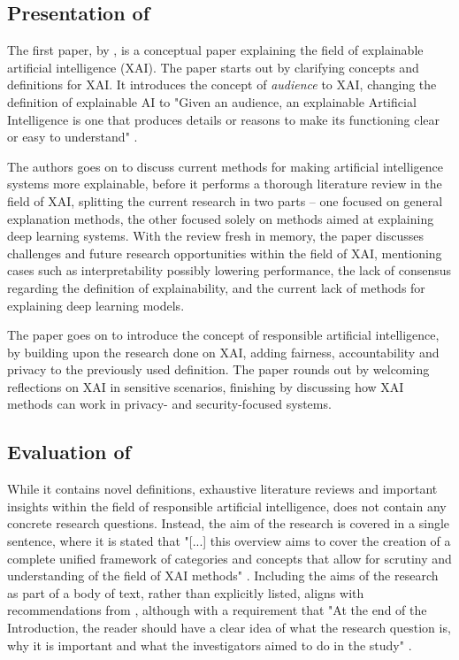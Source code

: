 \subsection[Presentation of Barredo Arrieta et al. (2020)]{Presentation of \textcite{Barredo_2020}}
The first paper,  by \textcite{Barredo_2020}, is a conceptual paper explaining the field of explainable artificial intelligence (XAI). The paper starts out by clarifying concepts and definitions for XAI. It introduces the concept of \textit{audience} to XAI, changing the definition of explainable AI to "Given an audience, an explainable Artificial Intelligence is one that produces details or reasons to make its functioning clear or easy to understand" \parencite[p.85]{Barredo_2020}.

The authors goes on to discuss current methods for making artificial intelligence systems more explainable, before it performs a thorough literature review in the field of XAI, splitting the current research in two parts -- one focused on general explanation methods, the other focused solely on methods aimed at explaining deep learning systems. With the review fresh in memory, the paper discusses challenges and future research opportunities within the field of XAI, mentioning cases such as interpretability possibly lowering performance, the lack of consensus regarding the definition of explainability, and the current lack of methods for explaining deep learning models.

The paper goes on to introduce the concept of responsible artificial intelligence, by building upon the research done on XAI, adding fairness, accountability and privacy to the previously used definition. The paper rounds out by welcoming reflections on XAI in sensitive scenarios, finishing by discussing how XAI methods can work in privacy- and security-focused systems.



\subsection[Evaluation of Barredo Arrieta et al. (2020)]{Evaluation of \textcite{Barredo_2020}}
While it contains novel definitions, exhaustive literature reviews and important insights within the field of responsible artificial intelligence, \textcite{Barredo_2020} does not contain any concrete research questions. Instead, the aim of the research is covered in a single sentence, where it is stated that "[...] this overview aims to cover the creation of a complete unified framework of categories and concepts that allow for scrutiny and understanding of the field of XAI methods" \parencite[p.83]{Barredo_2020}. Including the aims of the research as part of a body of text, rather than explicitly listed, aligns with recommendations from \textcite[p.359]{Davidson_2012}, although with a requirement that "At the end of the Introduction, the reader should have a clear idea of what the research question is, why it is important and what the investigators aimed to do in the study" \parencite[p.360]{Davidson_2012}.

